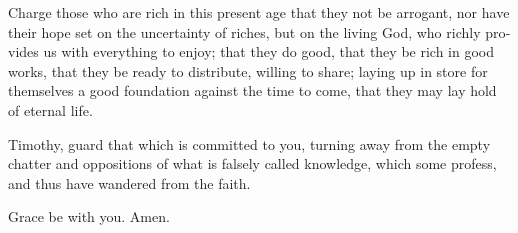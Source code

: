 \begin{paracol}{2}
\begin{otherlanguage}{english}
 Charge those who are rich in this present age that they
not be arrogant, nor have their hope set on the uncertainty of riches,
but on the living God, who richly provides us with everything to enjoy;
 that they do good, that they be rich in good works, that
they be ready to distribute, willing to share;  laying up
in store for themselves a good foundation against the time to come, that
they may lay hold of eternal life.

 Timothy, guard that which is committed to you, turning
away from the empty chatter and oppositions of what is falsely called
knowledge,  which some profess, and thus have wandered
from the faith.

Grace be with you. Amen. \end{otherlanguage}
\end{paracol}
